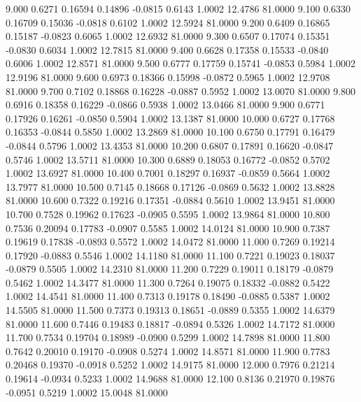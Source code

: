    9.000   0.6271   0.16594   0.14896  -0.0815   0.6143   1.0002  12.4786  81.0000
   9.100   0.6330   0.16709   0.15036  -0.0818   0.6102   1.0002  12.5924  81.0000
   9.200   0.6409   0.16865   0.15187  -0.0823   0.6065   1.0002  12.6932  81.0000
   9.300   0.6507   0.17074   0.15351  -0.0830   0.6034   1.0002  12.7815  81.0000
   9.400   0.6628   0.17358   0.15533  -0.0840   0.6006   1.0002  12.8571  81.0000
   9.500   0.6777   0.17759   0.15741  -0.0853   0.5984   1.0002  12.9196  81.0000
   9.600   0.6973   0.18366   0.15998  -0.0872   0.5965   1.0002  12.9708  81.0000
   9.700   0.7102   0.18868   0.16228  -0.0887   0.5952   1.0002  13.0070  81.0000
   9.800   0.6916   0.18358   0.16229  -0.0866   0.5938   1.0002  13.0466  81.0000
   9.900   0.6771   0.17926   0.16261  -0.0850   0.5904   1.0002  13.1387  81.0000
  10.000   0.6727   0.17768   0.16353  -0.0844   0.5850   1.0002  13.2869  81.0000
  10.100   0.6750   0.17791   0.16479  -0.0844   0.5796   1.0002  13.4353  81.0000
  10.200   0.6807   0.17891   0.16620  -0.0847   0.5746   1.0002  13.5711  81.0000
  10.300   0.6889   0.18053   0.16772  -0.0852   0.5702   1.0002  13.6927  81.0000
  10.400   0.7001   0.18297   0.16937  -0.0859   0.5664   1.0002  13.7977  81.0000
  10.500   0.7145   0.18668   0.17126  -0.0869   0.5632   1.0002  13.8828  81.0000
  10.600   0.7322   0.19216   0.17351  -0.0884   0.5610   1.0002  13.9451  81.0000
  10.700   0.7528   0.19962   0.17623  -0.0905   0.5595   1.0002  13.9864  81.0000
  10.800   0.7536   0.20094   0.17783  -0.0907   0.5585   1.0002  14.0124  81.0000
  10.900   0.7387   0.19619   0.17838  -0.0893   0.5572   1.0002  14.0472  81.0000
  11.000   0.7269   0.19214   0.17920  -0.0883   0.5546   1.0002  14.1180  81.0000
  11.100   0.7221   0.19023   0.18037  -0.0879   0.5505   1.0002  14.2310  81.0000
  11.200   0.7229   0.19011   0.18179  -0.0879   0.5462   1.0002  14.3477  81.0000
  11.300   0.7264   0.19075   0.18332  -0.0882   0.5422   1.0002  14.4541  81.0000
  11.400   0.7313   0.19178   0.18490  -0.0885   0.5387   1.0002  14.5505  81.0000
  11.500   0.7373   0.19313   0.18651  -0.0889   0.5355   1.0002  14.6379  81.0000
  11.600   0.7446   0.19483   0.18817  -0.0894   0.5326   1.0002  14.7172  81.0000
  11.700   0.7534   0.19704   0.18989  -0.0900   0.5299   1.0002  14.7898  81.0000
  11.800   0.7642   0.20010   0.19170  -0.0908   0.5274   1.0002  14.8571  81.0000
  11.900   0.7783   0.20468   0.19370  -0.0918   0.5252   1.0002  14.9175  81.0000
  12.000   0.7976   0.21214   0.19614  -0.0934   0.5233   1.0002  14.9688  81.0000
  12.100   0.8136   0.21970   0.19876  -0.0951   0.5219   1.0002  15.0048  81.0000
